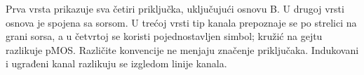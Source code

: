 Prva vrsta prikazuje sva četiri priključka, uključujući osnovu B. U drugoj vrsti osnova je spojena sa sorsom. U trećoj vrsti tip kanala prepoznaje se po strelici na grani sorsa, a u četvrtoj se koristi pojednostavljen simbol; kružić na gejtu razlikuje pMOS. Različite konvencije ne menjaju značenje priključaka. Indukovani i ugrađeni kanal razlikuju se izgledom linije kanala.
